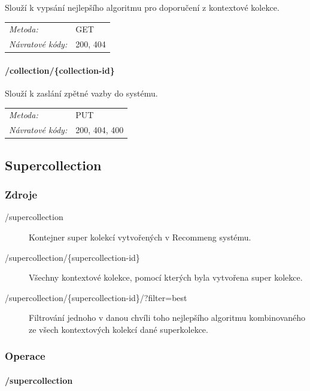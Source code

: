 \documentclass[thesis=M,czech]{FITthesis}[2014/05/07]
\begin{document}
Slouží k vypsání nejlepšího algoritmu pro doporučení z kontextové kolekce.

\begin{center}
 	\begin{tabular}{lp{10cm}}
 		\textit{Metoda:}		& GET			\tabularnewline 
 		\textit{Návratové kódy:}		& 200, 404			\tabularnewline 		
 	\end{tabular}	
\end{center} 

\paragraph*{/collection/\{collection-id\}}

Slouží k zaslání zpětné vazby do systému.

\begin{center}
 	\begin{tabular}{lp{10cm}}
 		\textit{Metoda:}		& PUT			\tabularnewline 
 		\textit{Návratové kódy:}		& 200, 404, 400			\tabularnewline 		
 	\end{tabular}	
\end{center} 

\subsection{Supercollection}

\subsubsection{Zdroje}

\begin{description}
	\item[/supercollection] Kontejner super kolekcí vytvořených v Recommeng systému.
	\item[/supercollection/\{supercollection-id\}] Všechny kontextové kolekce, pomocí kterých byla vytvořena super kolekce.
	\item[/supercollection/\{supercollection-id\}/?filter=best] Filtrování jednoho v danou chvíli toho nejlepšího algoritmu kombinovaného ze všech kontextových kolekcí dané superkolekce.
\end{description}

\subsubsection{Operace}

\paragraph*{/supercollection}
\end{document}
